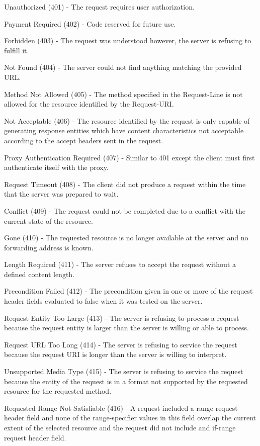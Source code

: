 \documentclass[12pt]{article}
\begin{document}
Unauthorized (401) - The request requires user authorization.

Payment Required (402) - Code reserved for future use.

Forbidden (403) - The request was understood however, the server is refusing to fulfill it.

Not Found (404) - The server could not find anything matching the provided URL.

Method Not Allowed (405) - The method specified in the Request-Line is not allowed for the resource identified by the Request-URI.

Not Acceptable (406) - The resource identified by the request is only capable of generating response entities which have content characteristics not acceptable according to the accept headers sent in the request.

Proxy Authentication Required (407) - Similar to 401 except the client must first authenticate itself with the proxy.

Request Timeout (408) - The client did not produce a request within the time that the server was prepared to wait.

Conflict (409) - The request could not be completed due to a conflict with the current state of the resource.

Gone (410) - The requested resource is no longer available at the server and no forwarding address is known.

Length Required (411) - The server refuses to accept the request without a defined content length.

Precondition Failed (412) - The precondition given in one or more of the request header fields evaluated to false when it was tested on the server. 

Request Entity Too Large (413) - The server is refusing to process a request because the request entity is larger than the server is willing or able to process.

Request URL Too Long (414) - The server is refusing to service the request because the request URI is longer than the server is willing to interpret.

Unsupported Media Type (415) - The server is refusing to service the request because the entity of the request is in a format not supported by the requested resource for the requested method.

Requested Range Not Satisfiable (416) - A request included a range request header field and none of the range-specifier values in this field overlap the current extent of the selected resource and the request did not include and if-range request header field.
\end{document}

